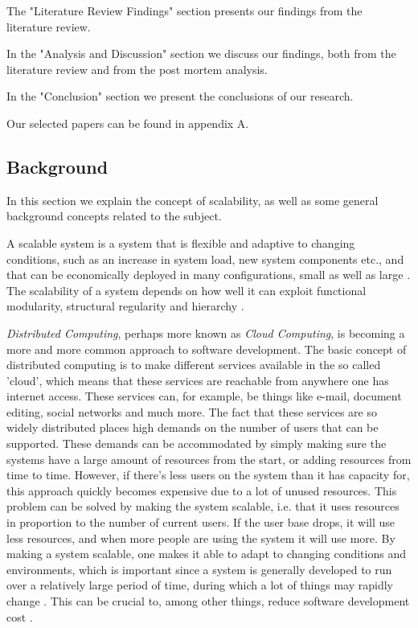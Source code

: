 \documentclass{article}
\begin{document}
The "Literature Review Findings" section presents our findings from the
literature review.  

In the "Analysis and Discussion" section we discuss our findings, both from the
literature review and from the post mortem analysis.

In the "Conclusion" section we present the conclusions of our research.

Our selected papers can be found in appendix A. 

\subsection{Background}

In this section we explain the concept of scalability, as well as some general
background concepts related to the subject.

A scalable system is a system that is flexible and adaptive to changing
conditions, such as an increase in system load, new system components etc., and
that can be economically deployed in many configurations, small as well as
large \cite{jogalekar2000evaluating}. The scalability of a system depends on
how well it can exploit functional modularity, structural regularity and
hierarchy \cite{lipson2007principles}.

\emph{Distributed Computing}, perhaps more known as \emph{Cloud Computing}, is
becoming a more and more common approach to software development. The basic
concept of distributed computing is to make different services available in the
so called 'cloud', which means that these services are reachable from anywhere
one has internet access. These services can, for example, be things like
e-mail, document editing, social networks and much more. The fact that these
services are so widely distributed places high demands on the number of users
that can be supported. These demands can be accommodated by simply making sure
the systems have a large amount of resources from the start, or adding
resources from time to time. However, if there's less users on the system than
it has capacity for, this approach quickly becomes expensive due to a lot of
unused resources. This problem can be solved by making the system scalable,
i.e. that it uses resources in proportion to the number of current users. If
the user base drops, it will use less resources, and when more people are using
the system it will use more. By making a system scalable, one makes it able to
adapt to changing conditions and environments, which is important since a
system is generally developed to run over a relatively large period of time,
during which a lot of things may rapidly change \cite{van1998software}
\cite{caruso1997toward}. This can be crucial to, among other things, reduce
software development cost \cite{fayad2005towards}.
\end{document}

